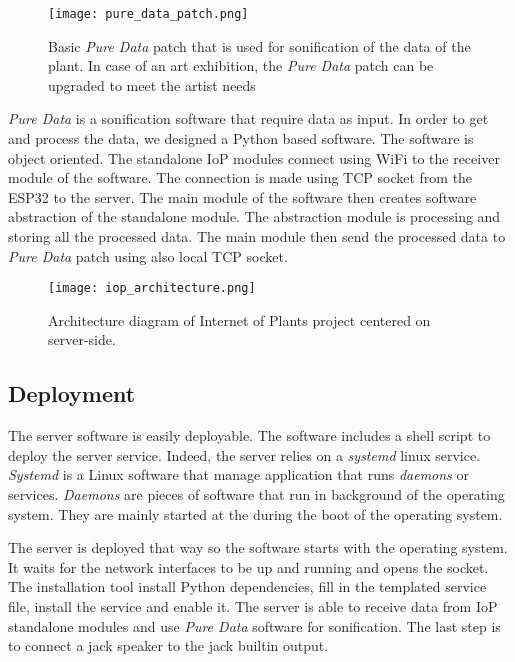 \begin{figure}[h]
    \centering
    \texttt{[image: pure\_data\_patch.png]}
    \caption{Basic \textit{Pure Data} patch that is used for sonification of the data
        of the plant. In case of an art exhibition, the \textit{Pure Data} patch can be upgraded to meet the
        artist needs}
    \vspace{0.1cm}
    \label{fig:pure_data_patch}
\end{figure}


\textit{Pure Data} is a sonification software that require data as input. In order to get and process the data, we designed a Python based software. %
The software is object oriented. The standalone IoP modules connect using WiFi to the receiver module
of the software. The connection is made using TCP socket from the ESP32 to the server.
The main module of the software then creates software abstraction of the standalone module.
The abstraction module is processing and storing all the processed data.
The main module then send the processed data to \textit{Pure Data} patch using also local TCP socket.

\begin{figure}[h]
    \centering
    \texttt{[image: iop\_architecture.png]}
    \caption{Architecture diagram of Internet of Plants project centered on server-side.}
    \vspace{0.1cm}
    \label{fig:server_architecture}
\end{figure}


\subsection{Deployment} %

The server software is easily deployable. The software includes a shell script to deploy the server service.
Indeed, the server relies on a \textit{systemd} linux service. \textit{Systemd} \cite{Both2020} is a
Linux software that manage application that runs \textit{daemons} or services.
\textit{Daemons} are pieces of software that run in background of the operating
system. They are mainly started at the during the boot of the operating system.

The server is deployed that way so the software starts with the operating system.
It waits for the network interfaces to be up and running and opens the socket.
The installation tool install Python dependencies, fill in the templated service file,
install the service and enable it. The server is able to receive data from IoP standalone
modules and use \textit{Pure Data} software for sonification. The last step is to connect
a jack speaker to the jack builtin output.


